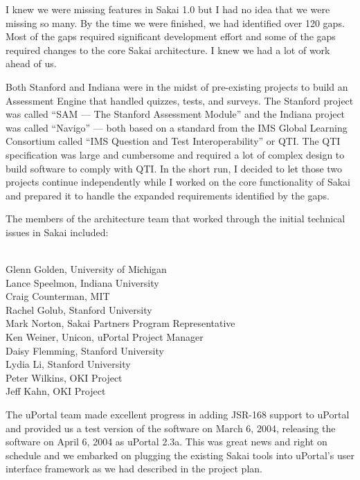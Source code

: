 \documentclass[12pt]{book}
\begin{document}
I knew we were missing features in Sakai 1.0 but I had no idea that
we were missing so many.  By the time we were finished, we
had identified over 120 gaps.  Most of the gaps required significant
development effort and some of the gaps required changes to the core
Sakai architecture.  I knew we had a lot of work ahead of us.

Both Stanford and Indiana were in the midst of pre-existing projects
to build an Assessment Engine that handled quizzes, tests, and surveys.
The Stanford project was called ``SAM --- The Stanford Assessment Module''
and the Indiana project was called ``Navigo'' --- both based on a
standard from the IMS Global Learning Consortium called ``IMS Question
and Test Interoperability'' or QTI.  The QTI specification was large
and cumbersome and required a lot of complex design to build software
to comply with QTI.  In the short run, I decided to let those two projects
continue independently while I worked on the core functionality of
Sakai and prepared it to handle the expanded requirements identified
by the gaps.

The members of the architecture team that worked through the initial technical
issues in Sakai included:\\
\\
\begin{sf}
Glenn Golden, University of Michigan\\
Lance Speelmon, Indiana University\\
Craig Counterman, MIT\\
Rachel Golub, Stanford University\\
Mark Norton, Sakai Partners Program Representative\\
Ken Weiner, Unicon, uPortal Project Manager\\
Daisy Flemming, Stanford University\\
Lydia Li, Stanford University\\
Peter Wilkins, OKI Project\\
Jeff Kahn, OKI Project\\
\end{sf}

The uPortal team made excellent progress in adding JSR-168 support to
uPortal and provided us a test version of the software on March 6, 2004,
releasing the software on April 6, 2004 as uPortal 2.3a.  This was
great news and right on schedule and we embarked on plugging the
existing Sakai tools into uPortal's user interface framework as we
had described in the project plan.
\end{document}
